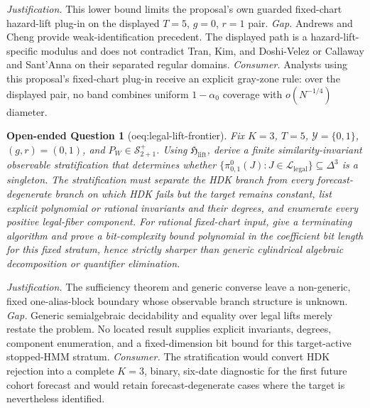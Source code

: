 \documentclass{article}
\newtheorem{openendedquestion}{Open-ended Question}
\begin{document}
\par\smallskip\noindent \textit{Justification.} This lower bound limits the proposal's own guarded fixed-chart hazard-lift plug-in on the displayed \(T=5\), \(g=0\), \(r=1\) pair. \textit{Gap.} Andrews and Cheng provide weak-identification precedent. The displayed path is a hazard-lift-specific modulus and does not contradict Tran, Kim, and Doshi-Velez or Callaway and Sant'Anna on their separated regular domains. \textit{Consumer.} Analysts using this proposal's fixed-chart plug-in receive an explicit gray-zone rule: over the displayed pair, no band combines uniform \(1-\alpha_0\) coverage with \(o(N^{-1/4})\) diameter.

\begin{openendedquestion}[oeq:legal-lift-frontier]\label{oeq:legal-lift-frontier}
Fix \(K=3\), \(T=5\), \(\mathcal Y=\{0,1\}\), \((g,r)=(0,1)\), and \(P_W\in\mathcal S^{+}_{2+1}\). Using \(\mathfrak H_{\mathrm{lift}}\), derive a finite similarity-invariant observable stratification that determines whether \(\{\pi^0_{0,1}(J):J\in\mathcal L_{\mathrm{legal}}\}\subseteq\Delta^3\) is a singleton. The stratification must separate the HDK branch from every forecast-degenerate branch on which HDK fails but the target remains constant, list explicit polynomial or rational invariants and their degrees, and enumerate every positive legal-fiber component. For rational fixed-chart input, give a terminating algorithm and prove a bit-complexity bound polynomial in the coefficient bit length for this fixed stratum, hence strictly sharper than generic cylindrical algebraic decomposition or quantifier elimination.
\end{openendedquestion}
\par\smallskip\noindent \textit{Justification.} The sufficiency theorem and generic converse leave a non-generic, fixed one-alias-block boundary whose observable branch structure is unknown. \textit{Gap.} Generic semialgebraic decidability and equality over legal lifts merely restate the problem. No located result supplies explicit invariants, degrees, component enumeration, and a fixed-dimension bit bound for this target-active stopped-HMM stratum. \textit{Consumer.} The stratification would convert HDK rejection into a complete \(K=3\), binary, six-date diagnostic for the first future cohort forecast and would retain forecast-degenerate cases where the target is nevertheless identified.
\end{document}
